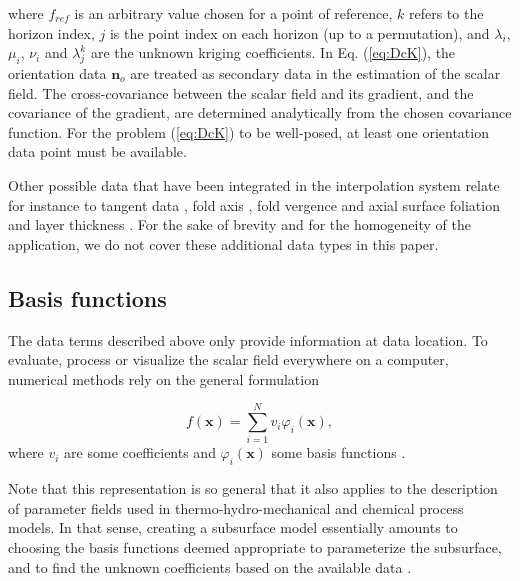 \documentclass[preprint]{ring20}
\newcommand{\bn}{\mathbf{n}}
\begin{document}
\noindent where $f_{ref}$ is an arbitrary value chosen for a point of reference, $k$ refers to the horizon index, $j$ is the point index on each horizon (up to a permutation), and $\lambda_i$, $\mu_i$, $\nu_i$ and $\lambda_j^k$ are the unknown kriging coefficients. In Eq. (\ref{eq:DcK}), the orientation data $\bn_o$ are treated as secondary data in the estimation of the scalar field. The cross-covariance between the scalar field and its gradient, and the covariance of the gradient, are determined analytically from the chosen covariance function. For the problem (\ref{eq:DcK}) to be well-posed, at least one orientation data point must be available. 

Other possible data that have been integrated in the interpolation system relate for instance to tangent data \citep{Lajaunie1997MG, Caumon2013GaRSITo, Hillier2014MG}, fold axis \citep{MassiotGM2010,Hillier2014MG}, fold vergence and axial surface foliation \citep{Laurent2016EaPSL,Grose2017JSG} and layer thickness \citep{Laurent2016MG}. For the sake of brevity and for the homogeneity of the application, we do not cover these additional data types in this paper. 

\subsection{Basis functions} 

The data terms described above only provide information at data location. To evaluate, process or visualize the scalar field everywhere on a computer, numerical methods rely on the general formulation 

\begin{equation}
\label{eq:basis}
  f(\mathbf{x}) = \sum_{i=1}^{N}{v_i\varphi_i(\mathbf{x})},
\end{equation}
\noindent where $v_i$ are some coefficients and $\varphi_i(\mathbf{x})$ some basis functions \citep[e.g., ][]{Hillier2014MG,Renaudeau2019MG}.

Note that this representation is so general that it also applies to the description of parameter fields used in thermo-hydro-mechanical and chemical process models. 
In that sense, creating a subsurface model essentially amounts to choosing the basis functions deemed appropriate to parameterize the subsurface, and to find the unknown coefficients based on the available data \citep{Caumon2018HoMG,Wellmann2018AiG}.
 
\end{document}
